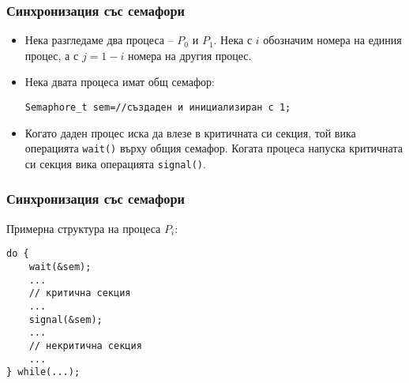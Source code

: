 \documentclass[ignorenonframetext, hyperref=unicode]{beamer}
\begin{document}
\begin{frame}[containsverbatim]
\frametitle{Синхронизация със семафори}
\begin{itemize}
\item Нека разгледаме два процеса -- $P_0$ и $P_1$. Нека с $i$ обозначим
  номера на единия процес, а с $j=1-i$ номера на другия процес.
\item Нека двата процеса имат общ семафор:
\begin{lstlisting}[numbers=none]
Semaphore_t sem=//създаден и инициализиран с 1;
\end{lstlisting}
\item Когато даден процес иска да влезе в критичната си секция, той вика
операцията \lstinline{wait()} върху общия семафор. Когата процеса напуска
критичната си секция вика операцията \lstinline{signal()}.
\end{itemize}
\end{frame}


\begin{frame}[containsverbatim]
\frametitle{Синхронизация със семафори}
Примерна структура на процеса $P_i$:
\begin{lstlisting}[numbers=none]
do {
	wait(&sem); 
	...
	// критична секция
	...
	signal(&sem);
	...
	// некритична секция
	...
} while(...);
\end{lstlisting}
\end{frame}
\end{document}
